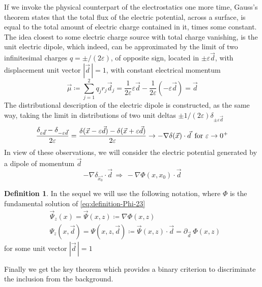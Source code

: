 \documentclass[10pt, a4paper, twoside, openright]{book}
\theoremstyle{definition}
\newtheorem{definition}[subsection]{Definition}
\theoremstyle{plain}
\theoremstyle{plain}
\theoremstyle{plain}
\theoremstyle{plain}
\theoremstyle{plain}
\theoremstyle{plain}
\theoremstyle{plain}
\theoremstyle{plain}
\let\epsilon\varepsilon
\begin{document}
If we invoke the physical counterpart of the electrostatics one more time, Gauss's theorem states that the total flux of the electric potential, across a surface, is equal to the total amount of electric charge contained in it, times some constant.
The idea closest to some electric charge source with total charge vanishing, is the unit electric dipole, which indeed, can be approximated by the limit of two infinitesimal charges $q=\pm/(2\epsilon)$, of opposite sign, located in $\pm\epsilon\vec{d}$, with displacement unit vector $|\vec{d}\,|=1$, with constant electrical momentum
\begin{equation}
 \vec{\mu}\coloneqq \sum_{j=1}^2 q_jr_j\vec{d}_j=\dfrac{1}{2\epsilon}\epsilon\vec{d} -\dfrac{1}{2\epsilon}(-\epsilon\vec{d})=\vec{d}
\end{equation}
The distributional description of the electric dipole is constructed, as the same way, taking the limit in distributions of two unit deltas $\pm1/(2\epsilon)\delta_{\pm\epsilon\vec{d}}\,$
\begin{equation}
 \dfrac{\delta_{\epsilon\vec{d}} - \delta_{-\epsilon\vec{d}}}{2\epsilon}=\dfrac{\delta(\vec{x} - \epsilon\vec{d}) - \delta(\vec{x}+\epsilon\vec{d})}{2\epsilon}\to -\nabla\delta(\vec{x})\cdot\vec{d}\, \textup{ for }\epsilon\to0^+
\end{equation}
In view of these observations, we will consider the electric potential generated by a dipole of momentum $\vec{d}$
\begin{equation}
 -\nabla\delta_{\vec{x_0}}\cdot\vec{d}\, \Longrightarrow\, -\nabla\Phi(x,x_0) \cdot \vec{d}
\end{equation}
\begin{definition}
\label{def:fund-sol-deriv-Psi}
In the sequel we will use the following notation, where $\Phi$ is the fundamental solution of \ref{eq:definition-Phi-23}
\begin{align}
 &\vec{\Psi}_z(x) = \vec{\Psi}(x,z) \coloneqq \nabla\Phi(x,z)\\
 &\Psi_z(x,\vec{d})= \Psi(x,z,\vec{d}) \coloneqq \vec{\Psi}(x,z)\cdot \vec{d} = \partial_{\vec{d}\,\,}\Phi(x,z)
\end{align}
for some unit vector $|\vec{d}\,|=1$
\end{definition}
Finally we get the key theorem which provides a binary criterion to discriminate the inclusion from the background.
\end{document}

